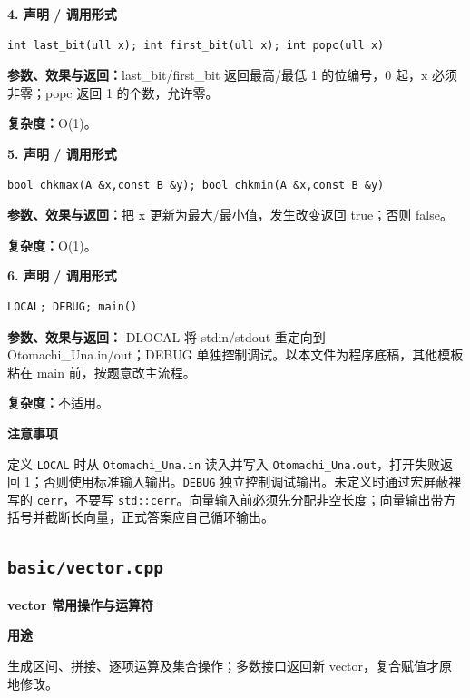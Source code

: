 \documentclass[UTF8,a4paper,10pt]{ctexart}
\newcommand{\TemplUsage}[1]{\textbf{用途}\par #1\par}
\newcommand{\TemplNote}[1]{\textbf{注意事项}\par #1\par}
\begin{document}
\noindent\begin{minipage}{\textwidth}
\textbf{4. 声明 / 调用形式}
\begin{lstlisting}
int last_bit(ull x); int first_bit(ull x); int popc(ull x)
\end{lstlisting}
\textbf{参数、效果与返回：}last\_bit/first\_bit 返回最高/最低 1 的位编号，0 起，x 必须非零；popc 返回 1 的个数，允许零。

\textbf{复杂度：}O(1)。

\end{minipage}\par\vspace{0.4em}
\noindent\begin{minipage}{\textwidth}
\textbf{5. 声明 / 调用形式}
\begin{lstlisting}
bool chkmax(A &x,const B &y); bool chkmin(A &x,const B &y)
\end{lstlisting}
\textbf{参数、效果与返回：}把 x 更新为最大/最小值，发生改变返回 true；否则 false。

\textbf{复杂度：}O(1)。

\end{minipage}\par\vspace{0.4em}
\noindent\begin{minipage}{\textwidth}
\textbf{6. 声明 / 调用形式}
\begin{lstlisting}
LOCAL; DEBUG; main()
\end{lstlisting}
\textbf{参数、效果与返回：}-DLOCAL 将 stdin/stdout 重定向到 Otomachi\_Una.in/out；DEBUG 单独控制调试。以本文件为程序底稿，其他模板粘在 main 前，按题意改主流程。

\textbf{复杂度：}不适用。

\TemplNote{定义 \texttt{LOCAL} 时从 \texttt{Otomachi\_Una.in} 读入并写入 \texttt{Otomachi\_Una.out}，打开失败返回 1；否则使用标准输入输出。\texttt{DEBUG} 独立控制调试输出。未定义时通过宏屏蔽裸写的 \texttt{cerr}，不要写 \texttt{std::cerr}。向量输入前必须先分配非空长度；向量输出带方括号并截断长向量，正式答案应自己循环输出。}
\end{minipage}\par\vspace{0.4em}
\clearpage
\subsection{\texttt{basic/vector.cpp}}
\textbf{vector 常用操作与运算符}\par
\TemplUsage{生成区间、拼接、逐项运算及集合操作；多数接口返回新 vector，复合赋值才原地修改。}
\end{document}
